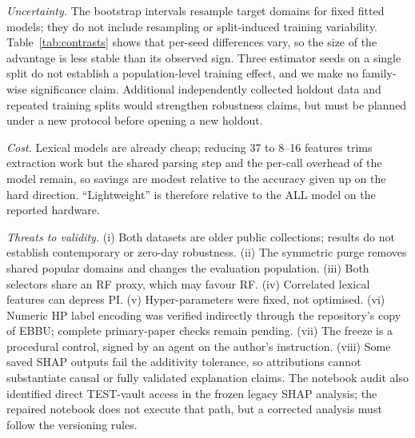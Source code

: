 \textit{Uncertainty.} The bootstrap intervals resample target domains for fixed fitted models; they do not include resampling or split-induced training variability. Table~\ref{tab:contrasts} shows that per-seed differences vary, so the size of the advantage is less stable than its observed sign. Three estimator seeds on a single split do not establish a population-level training effect, and we make no family-wise significance claim. Additional independently collected holdout data and repeated training splits would strengthen robustness claims, but must be planned under a new protocol before opening a new holdout.

\textit{Cost.} Lexical models are already cheap; reducing 37 to 8--16 features trims extraction work but the shared parsing step and the per-call overhead of the model remain, so savings are modest relative to the accuracy given up on the hard direction. ``Lightweight'' is therefore relative to the ALL model on the reported hardware.

\textit{Threats to validity.} (i) Both datasets are older public collections; results do not establish contemporary or zero-day robustness. (ii) The symmetric purge removes shared popular domains and changes the evaluation population. (iii) Both selectors share an RF proxy, which may favour RF. (iv) Correlated lexical features can depress PI. (v) Hyper-parameters were fixed, not optimised. (vi) Numeric HP label encoding was verified indirectly through the repository's copy of EBBU; complete primary-paper checks remain pending. (vii) The freeze is a procedural control, signed by an agent on the author's instruction. (viii) Some saved SHAP outputs fail the additivity tolerance, so attributions cannot substantiate causal or fully validated explanation claims. The notebook audit also identified direct TEST-vault access in the frozen legacy SHAP analysis; the repaired notebook does not execute that path, but a corrected analysis must follow the versioning rules.
